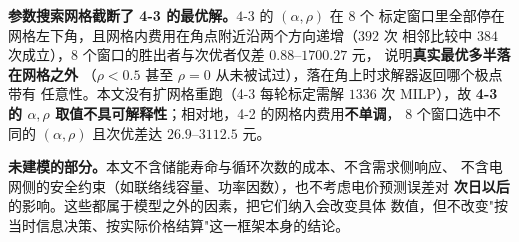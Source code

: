 \textbf{参数搜索网格截断了 4-3 的最优解。}$4$-$3$ 的 $(\alpha,\rho)$ 在 $8$ 个
标定窗口里全部停在网格左下角，且网格内费用在角点附近沿两个方向递增（$392$ 次
相邻比较中 $384$ 次成立），$8$ 个窗口的胜出者与次优者仅差 $0.88$--$1700.27$ 元，
说明\textbf{真实最优多半落在网格之外}
（$\rho<0.5$ 甚至 $\rho=0$ 从未被试过），落在角上时求解器返回哪个极点带有
任意性。本文没有扩网格重跑（4-3 每轮标定需解 $1336$ 次 MILP），故 \textbf{4-3
的 $\alpha,\rho$ 取值不具可解释性}；相对地，4-2 的网格内费用\textbf{不单调}，
$8$ 个窗口选中不同的 $(\alpha,\rho)$ 且次优差达 $26.9$--$3112.5$ 元。

\textbf{未建模的部分。}本文不含储能寿命与循环次数的成本、不含需求侧响应、
不含电网侧的安全约束（如联络线容量、功率因数），也不考虑电价预测误差对
\textbf{次日以后}的影响。这些都属于模型之外的因素，把它们纳入会改变具体
数值，但不改变"按当时信息决策、按实际价格结算"这一框架本身的结论。
